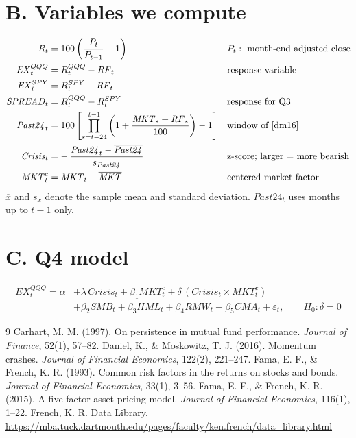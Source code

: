 \documentclass[11pt]{article}
\newcommand{\EX}{\mathit{EX}}
\newcommand{\MKT}{\mathit{MKT}}
\newcommand{\RF}{\mathit{RF}}
\newcommand{\PT}{\mathit{Past24}}
\begin{document}
\section*{B. Variables we compute}
\begin{align}
R_t &= 100\left(\frac{P_t}{P_{t-1}}-1\right)
  && P_t:\ \text{month-end adjusted close} \\
\EX^{QQQ}_t &= R^{QQQ}_t-\RF_t
  && \text{response variable} \\
\EX^{SPY}_t &= R^{SPY}_t-\RF_t \\
\mathit{SPREAD}_t &= R^{QQQ}_t-R^{SPY}_t
  && \text{response for Q3} \\
\PT_t &= 100\left[\prod_{s=t-24}^{t-1}\left(1+\frac{\MKT_s+\RF_s}{100}\right)-1\right]
  && \text{window of \cite{dm16}} \\
\mathit{Crisis}_t &= -\,\frac{\PT_t-\overline{\PT}}{s_{\PT}}
  && \text{z-score; larger = more bearish} \\
\MKT^c_t &= \MKT_t-\overline{\MKT}
  && \text{centered market factor}
\end{align}
$\overline{x}$ and $s_x$ denote the sample mean and standard deviation. $\PT_t$ uses months up to $t-1$ only.

\section*{C. Q4 model}
\begin{equation}
\begin{split}
\EX^{QQQ}_t=\alpha&+\lambda\,\mathit{Crisis}_t+\beta_1\MKT^c_t+\delta\,(\mathit{Crisis}_t\times\MKT^c_t)\\
&+\beta_2\mathit{SMB}_t+\beta_3\mathit{HML}_t+\beta_4\mathit{RMW}_t+\beta_5\mathit{CMA}_t+\varepsilon_t,
\qquad H_0:\delta=0
\end{split}
\end{equation}

\begin{thebibliography}{9}\small
{} Carhart, M. M. (1997). On persistence in mutual fund performance. \emph{Journal of Finance}, 52(1), 57--82.
 Daniel, K., \& Moskowitz, T. J. (2016). Momentum crashes. \emph{Journal of Financial Economics}, 122(2), 221--247.
 Fama, E. F., \& French, K. R. (1993). Common risk factors in the returns on stocks and bonds. \emph{Journal of Financial Economics}, 33(1), 3--56.
 Fama, E. F., \& French, K. R. (2015). A five-factor asset pricing model. \emph{Journal of Financial Economics}, 116(1), 1--22.
 French, K. R. Data Library. \url{https://mba.tuck.dartmouth.edu/pages/faculty/ken.french/data_library.html}
\end{thebibliography}
\end{document}
